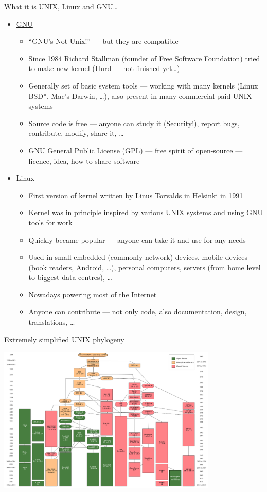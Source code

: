 \documentclass[hyperref={bookmarks=true, unicode=true, colorlinks=true, pdftitle={Linux, command line and MetaCentrum}, plainpages=false, pdfauthor={Vojtech Zeisek}, pdfsubject={Course about use of Linux command line, writing shell scripts and using MetaCentrum of CESNET}, pdfcreator={XeLaTeX, http://www.xelatex.org/}, pdfkeywords={Linux, GNU, BASH, shell, command line, MetaCentrum}, linkcolor=Sienna, anchorcolor=black, citecolor=green, filecolor=magenta, menucolor=Sienna, urlcolor=cyan, pdftex}, compress, ucs, xelatex, xcolor=svgnames, 11pt]{beamer}
\begin{document}
\begin{frame}[allowframebreaks]{What it is UNIX, Linux and GNU\ldots}
\begin{itemize}
\begin{itemize}
  \end{itemize}
  \item \href{https://www.gnu.org/}{GNU}
  \begin{itemize}
    \item ``GNU's Not Unix!'' --- but they are compatible
    \item Since 1984 Richard Stallman (founder of \href{https://www.fsf.org/}{Free Software Foundation}) tried to make new kernel (Hurd --- not finished yet\ldots)
    \item Generally set of basic system tools --- working with many kernels (Linux BSD*, Mac's Darwin, \ldots), also present in many commercial paid UNIX systems
    \item Source code is free --- anyone can study it (Security!), report bugs, contribute, modify, share it, \ldots
    \item GNU General Public License (GPL) --- free spirit of open-source --- licence, idea, how to share software
  \end{itemize}
  \item Linux
  \begin{itemize}
    \item First version of kernel written by Linus Torvalds in Helsinki in 1991
    \item Kernel was in principle inspired by various UNIX systems and using GNU tools for work
    \item Quickly became popular --- anyone can take it and use for any needs
    \item Used in small embedded (commonly network) devices, mobile devices (book readers, Android, \ldots), personal computers, servers (from home level to biggest data centres), \ldots
    \item Nowadays powering most of the Internet
    \item Anyone can contribute --- not only code, also documentation, design, translations, \ldots
  \end{itemize}
\end{itemize}
\end{frame}

\begin{frame}{Extremely simplified UNIX phylogeny}
\begin{center}
  \includegraphics[height=7cm]{unix_history-simple.png}
\end{center}
\end{frame}
\end{document}
